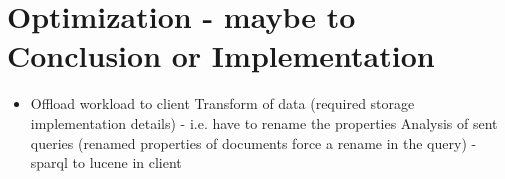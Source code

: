 \section{Optimization - maybe to Conclusion or Implementation}
\begin{itemize}
	\item Offload workload to client
		\subitem Transform of data (required storage implementation details) - i.e. have to rename the properties
		\subitem Analysis of sent queries (renamed properties of documents force a rename in the query) - sparql to lucene in client
\end{itemize}
